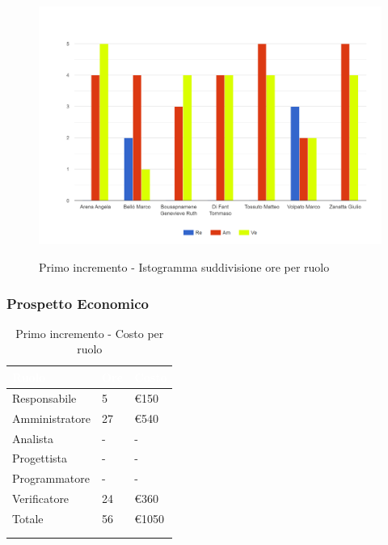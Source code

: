 {{      \begin{figure}[H]
        \includegraphics[width=15cm]{sezioni/images/primo.png}
        \centering
        \\
        \caption{Primo incremento - Istogramma suddivisione ore per ruolo}
     \end{figure}
    }

    \subsubsection{Prospetto Economico}
    {
        \setlength{\freewidth}{\dimexpr\textwidth-30\tabcolsep}
        \renewcommand{\arraystretch}{1.0}
        \setlength{\aboverulesep}{0pt}
        \setlength{\belowrulesep}{0pt}
        \begin{longtable}{C{.3\freewidth} C{.2\freewidth} C{.2\freewidth}}
          \toprule
        \textcolor{white}{\textbf{Ruolo}}&
        \textcolor{white}{\textbf{Ore}}&
        \textcolor{white}{\textbf{Costo}}\\
        \toprule
        \endhead
            
        Responsabile & 5 & \euro150\\        
        Amministratore & 27 & \euro540\\        
        Analista & - &-\\        
        Progettista&-&-\\        
        Programmatore&-&-\\
        Verificatore&24 & \euro360\\
        Totale&56&\euro1050\\
        \bottomrule
        \\
        \caption{Primo incremento - Costo per ruolo}


\end{longtable}}}
